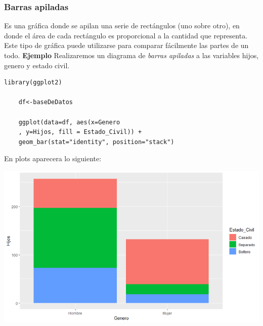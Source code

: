 \documentclass[12pt,hidelinks]{article}
\begin{document}
	\subsubsection{Barras apiladas}
	Es una gráfica donde se apilan una serie de rectángulos (uno sobre otro), en donde el área de cada rectángulo es proporcional a la cantidad que representa. Este tipo de gráfica puede utilizarse para comparar fácilmente las partes de un todo. \textbf{Ejemplo} Realizaremos un diagrama de \textit{barras apiladas} a las variables hijos, genero y estado civil.
	\begin{lstlisting}[frame=single]
	library(ggplot2)
	
	df<-baseDeDatos
	
	ggplot(data=df, aes(x=Genero
	, y=Hijos, fill = Estado_Civil)) + 
	geom_bar(stat="identity", position="stack")
	\end{lstlisting}
	En plots aparecera lo siguiente:
	\begin{center}
		\includegraphics[width = 14cm]{GraficaBarrasA.PNG}
	\end{center}
	
\end{document}
